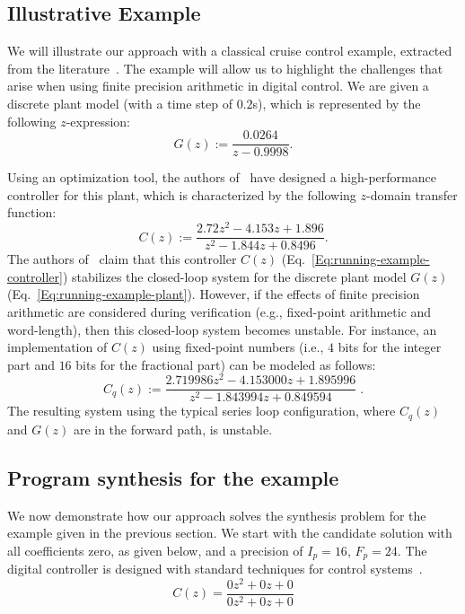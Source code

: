 \documentclass{sig-alternate-05-2015}
\newcommand{\red}[1]{{\color{red}#1}}
\begin{document}
\subsection{Illustrative Example} \label{sec:running-ex}

We will illustrate our approach with a classical cruise control example,
extracted from the literature~\cite{Astrom08}.  The example will allow us to
highlight the challenges that arise when using finite precision arithmetic
in digital control.  We are given a discrete plant model (with a time step
of $0.2$s), which is represented by the following $z$-expression:
%
\begin{equation}
\label{Eq:running-example-plant}
G\left(z\right) := \frac{0.0264}{z-0.9998}.
\end{equation}

Using an optimization tool, the authors
of~\cite{DBLP:conf/hybrid/WangGRJF16} have designed a high-performance
controller for this plant, which is characterized by the following
$z$-domain transfer function:
%
\begin{equation}
\label{Eq:running-example-controller}
C\left(z\right) := \frac{2.72z^2 - 4.153z + 1.896}{z^2 - 1.844z + 0.8496}.
\end{equation}
%
The authors of~\cite{DBLP:conf/hybrid/WangGRJF16} claim that this controller
$C(z)$ (Eq.~\eqref{Eq:running-example-controller}) stabilizes the
closed-loop system for the discrete plant model $G(z)$
(Eq.~\ref{Eq:running-example-plant}).  However, if the effects of finite
precision arithmetic are considered during verification (e.g., fixed-point
arithmetic and word-length), then this closed-loop system becomes unstable.
%
For instance, an implementation of $C(z)$ using  fixed-point
numbers (i.e., $4$ bits for the integer part and $16$ bits for the
fractional part) can be modeled as follows:
%
\begin{equation}
\label{Eq:running-example-controller-quantized}
C_{q}\left(z\right) {:=} \frac{2.719986z^2{-}4.153000z
{+}1.895996}{z^2{-}1.843994z+0.849594} \;.
\end{equation} 
%
The resulting system using the typical series loop configuration, where
$C_{q}\left(z\right)$ and $G\left(z\right)$ are in the forward path, is
unstable.
%
\subsection{Program synthesis for the example}
%
We now demonstrate how our approach solves the synthesis problem for the
example given in the previous section.  We start with the candidate solution
with all coefficients zero, as given below, and a precision of $I_p=16$,
$F_p=24$.  The digital controller is designed with standard techniques for
control systems~\cite{Kuo:2002:ACS:579453, Ogata:1987:DCS:26170}.
%
%
$$ C(z)=\frac{0z^2{+}0z{+}0}{0z^2{+}0z{+}0} $$
\end{document}
